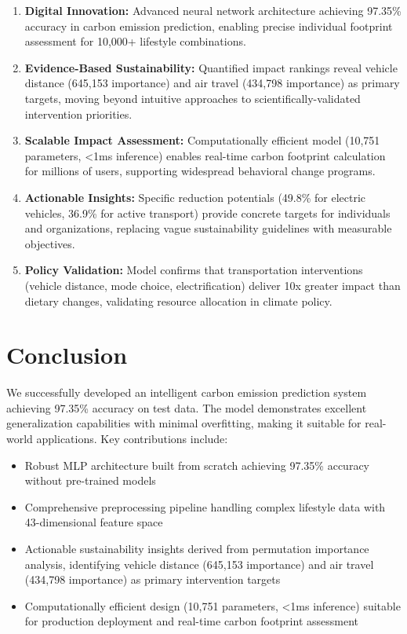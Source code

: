\documentclass[12pt,a4paper]{article}
\begin{document}
\begin{enumerate}
    \item \textbf{Digital Innovation:} Advanced neural network architecture achieving 97.35\% accuracy in carbon emission prediction, enabling precise individual footprint assessment for 10,000+ lifestyle combinations.
    
    \item \textbf{Evidence-Based Sustainability:} Quantified impact rankings reveal vehicle distance (645,153 importance) and air travel (434,798 importance) as primary targets, moving beyond intuitive approaches to scientifically-validated intervention priorities.
    
    \item \textbf{Scalable Impact Assessment:} Computationally efficient model (10,751 parameters, <1ms inference) enables real-time carbon footprint calculation for millions of users, supporting widespread behavioral change programs.
    
    \item \textbf{Actionable Insights:} Specific reduction potentials (49.8\% for electric vehicles, 36.9\% for active transport) provide concrete targets for individuals and organizations, replacing vague sustainability guidelines with measurable objectives.
    
    \item \textbf{Policy Validation:} Model confirms that transportation interventions (vehicle distance, mode choice, electrification) deliver 10x greater impact than dietary changes, validating resource allocation in climate policy.
\end{enumerate}

\section{Conclusion}

We successfully developed an intelligent carbon emission prediction system achieving 97.35\% accuracy on test data. The model demonstrates excellent generalization capabilities with minimal overfitting, making it suitable for real-world applications. Key contributions include:

\begin{itemize}
    \item Robust MLP architecture built from scratch achieving 97.35\% accuracy without pre-trained models
    \item Comprehensive preprocessing pipeline handling complex lifestyle data with 43-dimensional feature space
    \item Actionable sustainability insights derived from permutation importance analysis, identifying vehicle distance (645,153 importance) and air travel (434,798 importance) as primary intervention targets
    \item Computationally efficient design (10,751 parameters, <1ms inference) suitable for production deployment and real-time carbon footprint assessment
\end{itemize}
\end{document}
